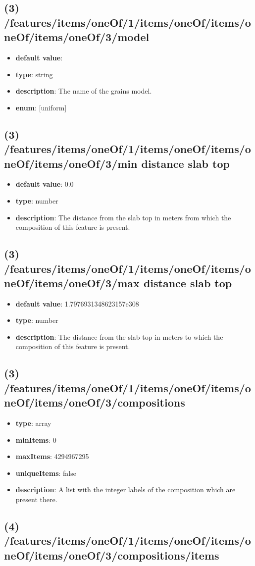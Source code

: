 \subsection{(3) /features/items/oneOf/1/items/oneOf/items/oneOf/items/oneOf/3/model}
\begin{itemize}[leftmargin=3em]\item {\bf default value}: 
\item {\bf type}: string
\item {\bf description}: The name of the grains model.
\item {\bf enum}: [uniform]\end{itemize}\subsection{(3) /features/items/oneOf/1/items/oneOf/items/oneOf/items/oneOf/3/min distance slab top}
\begin{itemize}[leftmargin=3em]\item {\bf default value}: 0.0
\item {\bf type}: number
\item {\bf description}: The distance from the slab top in meters from which the composition of this feature is present.
\end{itemize}\subsection{(3) /features/items/oneOf/1/items/oneOf/items/oneOf/items/oneOf/3/max distance slab top}
\begin{itemize}[leftmargin=3em]\item {\bf default value}: 1.7976931348623157e308
\item {\bf type}: number
\item {\bf description}: The distance from the slab top in meters to which the composition of this feature is present.
\end{itemize}\subsection{(3) /features/items/oneOf/1/items/oneOf/items/oneOf/items/oneOf/3/compositions}
\begin{itemize}[leftmargin=3em]\item {\bf type}: array
\item {\bf minItems}: 0
\item {\bf maxItems}: 4294967295
\item {\bf uniqueItems}: false
\item {\bf description}: A list with the integer labels of the composition which are present there.
\end{itemize}\subsection{(4) /features/items/oneOf/1/items/oneOf/items/oneOf/items/oneOf/3/compositions/items}
